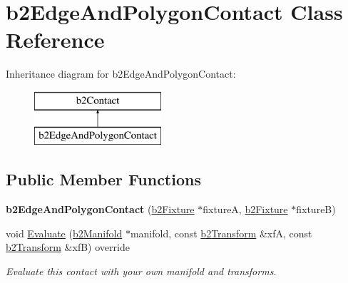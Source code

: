 \hypertarget{classb2EdgeAndPolygonContact}{}\section{b2\+Edge\+And\+Polygon\+Contact Class Reference}
\label{classb2EdgeAndPolygonContact}
Inheritance diagram for b2\+Edge\+And\+Polygon\+Contact\+:\begin{figure}[H]
\begin{center}
\leavevmode
\includegraphics[height=2.000000cm]{classb2EdgeAndPolygonContact}
\end{center}
\end{figure}
\subsection*{Public Member Functions}
\begin{DoxyCompactItemize}
\item 
\mbox{\label{classb2EdgeAndPolygonContact_a79d9b012c4a0df7d5c3dcecd33df7d5f}} 
{\bfseries b2\+Edge\+And\+Polygon\+Contact} (\mbox{\hyperlink{classb2Fixture}{b2\+Fixture}} $\ast$fixtureA, \mbox{\hyperlink{classb2Fixture}{b2\+Fixture}} $\ast$fixtureB)
\item 
\mbox{\label{classb2EdgeAndPolygonContact_ae99fba8c1cb7e5d7c11ab78ca80e775d}} 
void \mbox{\hyperlink{classb2EdgeAndPolygonContact_ae99fba8c1cb7e5d7c11ab78ca80e775d}{Evaluate}} (\mbox{\hyperlink{structb2Manifold}{b2\+Manifold}} $\ast$manifold, const \mbox{\hyperlink{structb2Transform}{b2\+Transform}} \&xfA, const \mbox{\hyperlink{structb2Transform}{b2\+Transform}} \&xfB) override
\begin{DoxyCompactList}\small\item\em Evaluate this contact with your own manifold and transforms. \end{DoxyCompactList}\end{DoxyCompactItemize}
